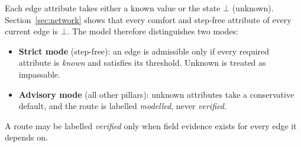 \documentclass[11pt,a4paper]{article}
\begin{document}
Each edge attribute takes either a known value or the state $\bot$ (unknown). Section~\ref{sec:network}
shows that every comfort and step-free attribute of every current edge is $\bot$. The model therefore
distinguishes two modes:
\begin{itemize}
  \item \textbf{Strict mode} (step-free): an edge is admissible only if every required attribute is
    \emph{known} and satisfies its threshold. Unknown is treated as impassable.
  \item \textbf{Advisory mode} (all other pillars): unknown attributes take a conservative default,
    and the route is labelled \emph{modelled}, never \emph{verified}.
\end{itemize}
A route may be labelled \emph{verified} only when field evidence exists for every edge it depends on.
\end{document}
